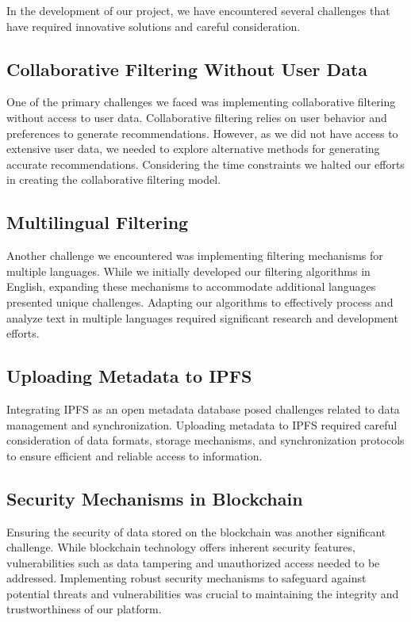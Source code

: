 \documentclass{article}
\begin{document}
In the development of our project, we have encountered several challenges that have required innovative solutions and careful consideration.

\subsection{Collaborative Filtering Without User Data}

One of the primary challenges we faced was implementing collaborative filtering without access to user data. Collaborative filtering relies on user behavior and preferences to generate recommendations. However, as we did not have access to extensive user data, we needed to explore alternative methods for generating accurate recommendations. Considering the time constraints we halted our efforts in creating the collaborative filtering model.

\subsection{Multilingual Filtering}

Another challenge we encountered was implementing filtering mechanisms for multiple languages. While we initially developed our filtering algorithms in English, expanding these mechanisms to accommodate additional languages presented unique challenges. Adapting our algorithms to effectively process and analyze text in multiple languages required significant research and development efforts.

\subsection{Uploading Metadata to IPFS}

Integrating IPFS as an open metadata database posed challenges related to data management and synchronization. Uploading metadata to IPFS required careful consideration of data formats, storage mechanisms, and synchronization protocols to ensure efficient and reliable access to information.

\subsection{Security Mechanisms in Blockchain}

Ensuring the security of data stored on the blockchain was another significant challenge. While blockchain technology offers inherent security features, vulnerabilities such as data tampering and unauthorized access needed to be addressed. Implementing robust security mechanisms to safeguard against potential threats and vulnerabilities was crucial to maintaining the integrity and trustworthiness of our platform.
\end{document}
